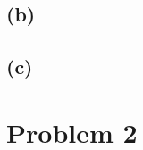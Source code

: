 \documentclass[11pt]{article}
\begin{document}
\subsection{(b)}


\subsection{(c)}


\section{Problem 2}

%
% 
% 
\end{document}
